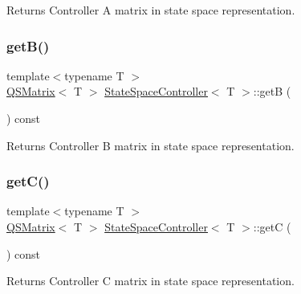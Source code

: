 \begin{DoxyReturn}{Returns}
Controller A matrix in state space representation. 
\end{DoxyReturn}
\mbox{\label{classStateSpaceController_a6435a06adbe5654d2fff6923da41db0c}} 
\subsubsection{\texorpdfstring{get\+B()}{getB()}}
{\footnotesize\ttfamily template$<$typename T $>$ \\
\hyperlink{classQSMatrix}{Q\+S\+Matrix}$<$ T $>$ \hyperlink{classStateSpaceController}{State\+Space\+Controller}$<$ T $>$\+::getB (\begin{DoxyParamCaption}{ }\end{DoxyParamCaption}) const}

\begin{DoxyReturn}{Returns}
Controller B matrix in state space representation. 
\end{DoxyReturn}
\mbox{\label{classStateSpaceController_a2dd0a3e589883cbefa64117db401eb60}} 
\subsubsection{\texorpdfstring{get\+C()}{getC()}}
{\footnotesize\ttfamily template$<$typename T $>$ \\
\hyperlink{classQSMatrix}{Q\+S\+Matrix}$<$ T $>$ \hyperlink{classStateSpaceController}{State\+Space\+Controller}$<$ T $>$\+::getC (\begin{DoxyParamCaption}{ }\end{DoxyParamCaption}) const}

\begin{DoxyReturn}{Returns}
Controller C matrix in state space representation. 
\end{DoxyReturn}
\mbox{\label{classStateSpaceController_a7f0850ef94f5660a41101cf2fb5221ba}} 
